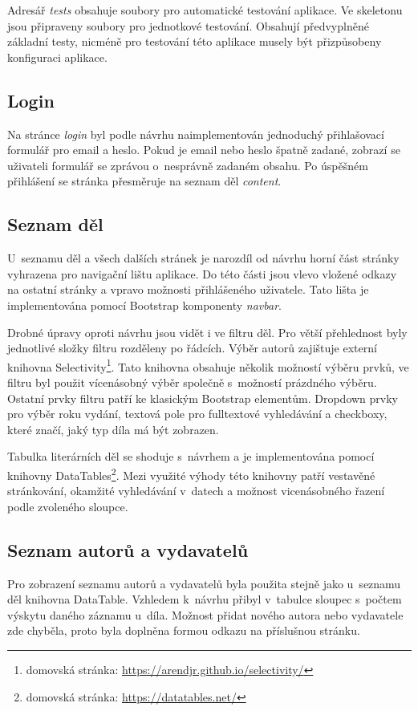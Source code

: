              Adresář \textit{tests} obsahuje soubory pro automatické testování aplikace. Ve skeletonu jsou připraveny soubory pro jednotkové testování. Obsahují předvyplněné základní testy, nicméně pro testování této aplikace musely být přizpůsobeny konfiguraci aplikace.
             
        \subsection{Login}
            Na stránce \textit{login} byl podle návrhu naimplementován jednoduchý přihlašovací formulář pro email a heslo. Pokud je email nebo heslo špatně zadané, zobrazí se uživateli formulář se zprávou o~nesprávně zadaném obsahu. Po úspěšném přihlášení se stránka přesměruje na seznam děl \textit{content}.
            
        \subsection{Seznam děl}
            U~seznamu děl a všech dalších stránek je narozdíl od návrhu horní část stránky vyhrazena pro navigační lištu aplikace. Do této části jsou vlevo vložené odkazy na ostatní stránky a vpravo možnosti přihlášeného uživatele. Tato lišta je implementována pomocí Bootstrap komponenty \textit{navbar}. 
            
            Drobné úpravy oproti návrhu jsou vidět i ve filtru děl. Pro větší přehlednost byly jednotlivé složky filtru rozděleny po řádcích. Výběr autorů zajištuje externí knihovna Selectivity\footnote{domovská stránka: \url{https://arendjr.github.io/selectivity/}}. Tato knihovna obsahuje několik možností výběru prvků, ve filtru byl použit vícenásobný výběr společně s~možností prázdného výběru. Ostatní prvky filtru patří ke klasickým Bootstrap elementům. Dropdown prvky pro výběr roku vydání, textová pole pro fulltextové vyhledávání a checkboxy, které značí, jaký typ díla má být zobrazen.
            
            Tabulka literárních děl se shoduje s~návrhem a je implementována pomocí knihovny DataTables\footnote{domovská stránka: \url{https://datatables.net/}}. Mezi využité  výhody této knihovny patří vestavěné stránkování, okamžité vyhledávání v~datech a možnost vicenásobného řazení podle zvoleného sloupce.
            
        \subsection{Seznam autorů a vydavatelů}
            Pro zobrazení seznamu autorů a vydavatelů byla použita stejně jako u~seznamu děl knihovna DataTable. Vzhledem k~návrhu přibyl v~tabulce sloupec s~počtem výskytu daného záznamu u~díla. Možnost přidat nového autora nebo vydavatele zde chyběla, proto byla doplněna formou odkazu na příslušnou stránku.
        
